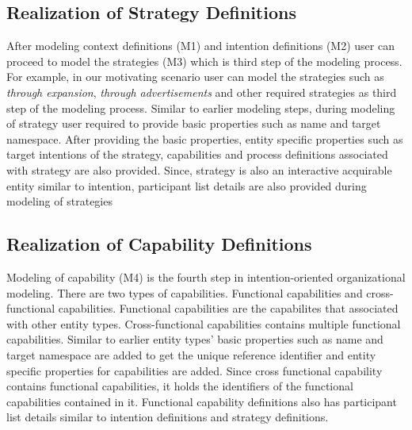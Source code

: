 \subsection{Realization of Strategy Definitions}
After modeling context definitions (M1) and intention definitions (M2) user can proceed to model the strategies (M3) which is third step of the modeling process. For example, in our motivating scenario user can model the strategies such as \textit{through expansion}, \textit{through advertisements} and other required strategies as third step of the modeling process. Similar to earlier modeling steps, during modeling of strategy user required to provide basic properties such as name and target namespace. After providing the basic properties, entity specific properties such as target intentions of the strategy, capabilities and process definitions associated with strategy are also provided. Since, strategy is also an interactive acquirable entity similar to intention, participant list details are also provided during modeling of strategies

\subsection{Realization of Capability Definitions}
Modeling of capability (M4) is the fourth step in intention-oriented organizational modeling. There are two types of capabilities. Functional capabilities and cross-functional capabilities. Functional capabilities are the capabilites that associated with other entity types. Cross-functional capabilities contains multiple functional capabilities. Similar to earlier entity types' basic properties such as name and target namespace are added to get the unique reference identifier and entity specific properties for capabilities are added. Since cross functional capability contains functional capabilities, it holds the identifiers of the functional capabilities contained in it. Functional capability definitions also has participant list details similar to intention definitions and strategy definitions. 

